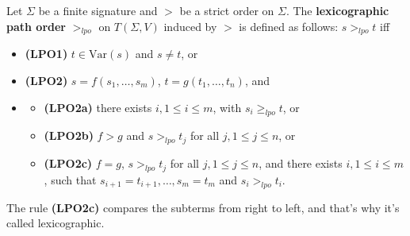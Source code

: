 \begin{definition}[LPO]
  Let $\Sigma$ be a finite signature and $>$ be a strict order on $\Sigma$. The \textbf{lexicographic path order}  $>_{lpo}$ on $T(\Sigma, V)$ induced by $>$ is defined as follows: $s >_{lpo} t$ iff
  \begin{itemize}
    \item \textbf{(LPO1)} $t \in \mathrm{Var}(s)$ and $s \neq t$, or
    \item \textbf{(LPO2)} $s = f(s_1, \dots, s_m)$, $t = g(t_1, \dots, t_n)$, and
    \item \begin{itemize}
      \item \textbf{(LPO2a)} there exists $i, 1\leq i \leq m$, with $s_i \geq_{lpo} t$, or
      \item \textbf{(LPO2b)} $f > g$ and $s >_{lpo} t_j$ for all $j, 1\leq j \leq n$, or
      \item \textbf{(LPO2c)} $f = g$, $s >_{lpo} t_j$ for all $j, 1\leq j \leq n$, and there exists $i, 1 \leq i \leq m$, such that $s_{i+1} = t_{i+1}, \dots, s_m = t_m$ and $s_i >_{lpo} t_i$.
    \end{itemize}
  \end{itemize}
  
\end{definition}

The rule \textbf{(LPO2c)} compares the subterms from right to left, and that's why it's called lexicographic.


